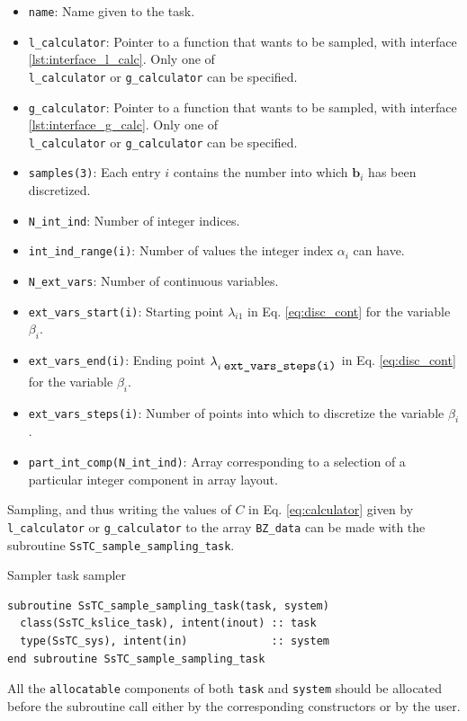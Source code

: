 \documentclass[10pt,a4paper]{article}
\begin{document}
\begin{tcolorbox}
\begin{itemize}
\item \verb|name|: Name given to the task.
\item \verb|l_calculator|: Pointer to a function that wants to be sampled, with interface \ref{lst:interface_l_calc}. Only one of \\ \verb|l_calculator| or \verb|g_calculator| can be specified.
\item \verb|g_calculator|: Pointer to a function that wants to be sampled, with interface \ref{lst:interface_g_calc}. Only one of \\ \verb|l_calculator| or \verb|g_calculator| can be specified.
\item \verb|samples(3)|: Each entry $i$ contains the number into which $\bm{b}_i$ has been discretized.
\item \verb|N_int_ind|: Number of integer indices.
\item \verb|int_ind_range(i)|: Number of values the integer index $\alpha_i$ can have.
\item \verb|N_ext_vars|: Number of continuous variables.
\item \verb|ext_vars_start(i)|: Starting point $\lambda_{i1}$ in Eq. \eqref{eq:disc_cont} for the variable $\beta_i$.
\item \verb|ext_vars_end(i)|: Ending point $\lambda_{i\;\verb|ext_vars_steps(i)|}$ in Eq. \eqref{eq:disc_cont} for the variable $\beta_i$.
\item \verb|ext_vars_steps(i)|: Number of points into which to discretize the variable $\beta_i$.
\item \verb|part_int_comp(N_int_ind)|: Array corresponding to a selection of a particular integer component in array layout.
\end{itemize}
\end{tcolorbox}
Sampling, and thus writing the values of $C$ in Eq. \eqref{eq:calculator} given by \verb|l_calculator| or \verb|g_calculator| to the array \verb|BZ_data| can be made with the subroutine \verb|SsTC_sample_sampling_task|.
\begin{codebox}{Sampler task sampler}
\begin{lstlisting}[caption={Interface of the sampling task sampler.},captionpos=b]
subroutine SsTC_sample_sampling_task(task, system)
  class(SsTC_kslice_task), intent(inout) :: task
  type(SsTC_sys), intent(in)             :: system
end subroutine SsTC_sample_sampling_task
\end{lstlisting}
\end{codebox}
All the \verb|allocatable| components of both \verb|task| and \verb|system| should be allocated before the subroutine call either by the corresponding constructors or by the user.
\end{document}
